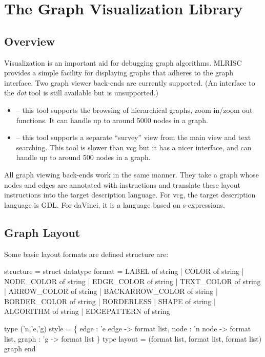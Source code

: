 \section{The Graph Visualization Library}
\subsection{Overview}
Visualization is an important aid for debugging graph algorithms.
MLRISC provides a simple facility for displaying graphs that
adheres to the graph interface.  Two graph viewer 
back-ends are currently supported.  (An interface to the \emph{dot}
tool is still available but is unsupported.)
\begin{itemize}
 \item {} -- 
     this tool supports the browsing
 of hierarchical graphs, zoom in/zoom out functions.  It can
 handle up to around 5000 nodes in a graph.
 \item {} -- 
   this tool supports a separate
 ``survey'' view from the main view and text searching.  This tool is
slower than vcg but it has a nicer interface, and
 can handle up to around 500 nodes in a graph.
\end{itemize}
All graph viewing back-ends work in the same manner.  
They take a graph whose nodes and edges are annotated with 
instructions and translate these layout instructions
into the target description language.  For vcg, the target description
language is GDL.  For daVinci, it is a language based on s-expressions.

\subsection{Graph Layout}
Some basic layout formats are defined structure  are:
\begin{SML}
 structure  = struct
   datatype format =
     LABEL of string
   | COLOR of string
   | NODE_COLOR of string
   | EDGE_COLOR of string
   | TEXT_COLOR of string
   | ARROW_COLOR of string
   | BACKARROW_COLOR of string
   | BORDER_COLOR of string
   | BORDERLESS 
   | SHAPE of string 
   | ALGORITHM of string
   | EDGEPATTERN of string

   type ('n,'e,'g) style = 
      \{ edge  : 'e edge -> format list,
        node  : 'n node -> format list,
        graph : 'g -> format list
      \}
   type layout = (format list, format list, format list) graph
 end
\end{SML}

